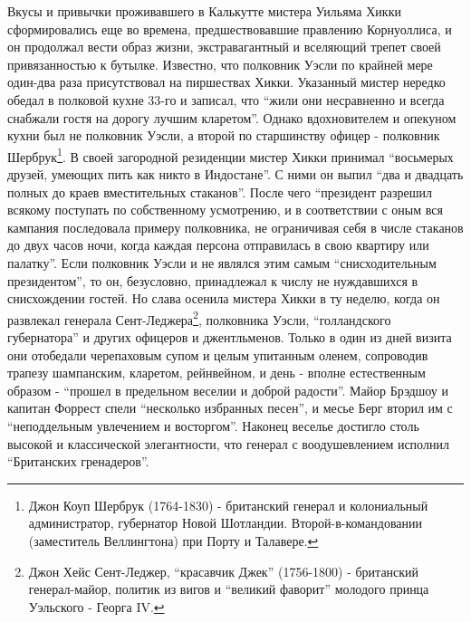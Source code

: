 \documentclass[
  oneside,
  12pt,
  titlepage]{book}
\begin{document}
Вкусы и привычки проживавшего в Калькутте мистера Уильяма Хикки сформировались еще во времена, предшествовавшие правлению Корнуоллиса, и он продолжал вести образ жизни, экстравагантный и вселяющий трепет своей привязанностью к бутылке. Известно, что полковник Уэсли по крайней мере один-два раза присутствовал на пиршествах Хикки. Указанный мистер нередко обедал в полковой кухне 33-го и записал, что ``жили они несравненно и всегда снабжали гостя на дорогу лучшим кларетом''. Однако вдохновителем и опекуном кухни был не полковник Уэсли, а второй по старшинству офицер - полковник Шербрук\footnote{Джон Коуп Шербрук (1764-1830) - британский генерал и колониальный администратор, губернатор Новой Шотландии. Второй-в-командовании (заместитель Веллингтона) при Порту и Талавере.}. В своей загородной резиденции мистер Хикки принимал ``восьмерых друзей, умеющих пить как никто в Индостане''. С ними он выпил ``два и двадцать полных до краев вместительных стаканов''. После чего ``президент разрешил всякому поступать по собственному усмотрению, и в соответствии с оным вся кампания последовала примеру полковника, не ограничивая себя в числе стаканов до двух часов ночи, когда каждая персона отправилась в свою квартиру или палатку''. Если полковник Уэсли и не являлся этим самым ``снисходительным президентом'', то он, безусловно, принадлежал к числу не нуждавшихся в снисхождении гостей. Но слава осенила мистера Хикки в ту неделю, когда он развлекал генерала Сент-Леджера\footnote{Джон Хейс Сент-Леджер, ``красавчик Джек'' (1756-1800) - британский генерал-майор, политик из вигов и ``великий фаворит'' молодого принца Уэльского - Георга IV.}, полковника Уэсли, ``голландского губернатора'' и других офицеров и джентльменов. Только в один из дней визита они отобедали черепаховым супом и целым упитанным оленем, сопроводив трапезу шампанским, кларетом, рейнвейном, и день - вполне естественным образом - ``прошел в предельном веселии и доброй радости''. Майор Брэдшоу и капитан Форрест спели ``несколько избранных песен'', и месье Берг вторил им с ``неподдельным увлечением и восторгом''. Наконец веселье достигло столь высокой и классической элегантности, что генерал с воодушевлением исполнил ``Британских гренадеров''.
\end{document}
